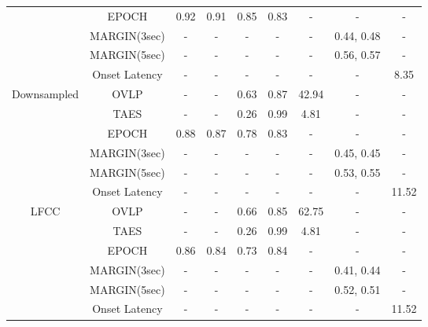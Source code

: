 \documentclass[pmlr,twocolumn,10pt]{jmlr}
\begin{document}
\begin{table*}[ht!]
\begin{tabular}{c|c|ccccccc}
		& EPOCH & 0.92 & 0.91 & 0.85 & 0.83 & - & - & - \\
		& MARGIN(3sec)  & - & - & - & - & - & 0.44, 0.48 & - \\
		& MARGIN(5sec) & - & - & - & - & - & 0.56, 0.57 & - \\
		& Onset Latency & - & - & - & - & - & - & 8.35 \\
		\midrule
		\multirow{6}{*}{Downsampled} 
		& OVLP & - & - & 0.63 & 0.87 & 42.94 & - & - \\
		& TAES & - & - & 0.26 & 0.99 & 4.81 & - & - \\
		& EPOCH & 0.88 & 0.87 & 0.78 & 0.83 & - & - & - \\
		& MARGIN(3sec)  & - & - & - & - & - & 0.45, 0.45 & - \\
		& MARGIN(5sec) & - & - & - & - & - & 0.53, 0.55 & - \\
		& Onset Latency & - & - & - & - & - & - & 11.52 \\
		\midrule
		\multirow{6}{*}{LFCC} 
		& OVLP & - & - & 0.66 & 0.85 & 62.75 & - & - \\
		& TAES & - & - & 0.26 & 0.99 & 4.81 & - & - \\
		& EPOCH & 0.86 & 0.84 & 0.73 & 0.84 & - & - & - \\
		& MARGIN(3sec)  & - & - & - & - & - & 0.41, 0.44 & - \\
		& MARGIN(5sec) & - & - & - & - & - & 0.52, 0.51 & - \\
		& Onset Latency & - & - & - & - & - & - & 11.52 \\
		\bottomrule
	\end{tabular}
\end{table*}
 
\end{document}
